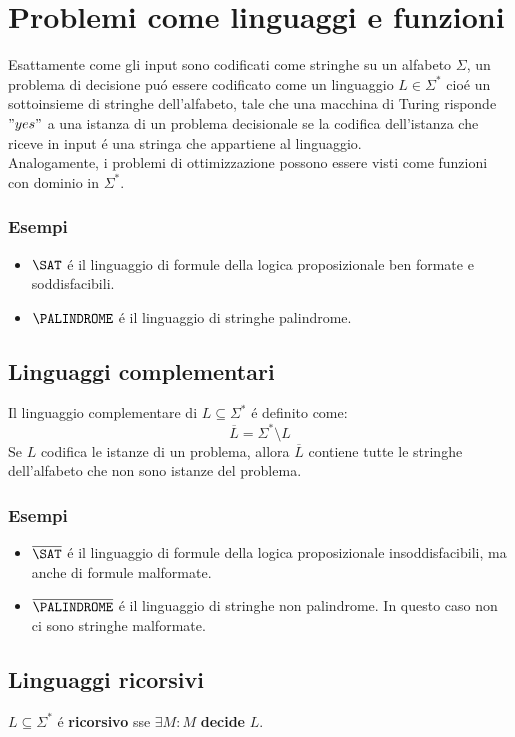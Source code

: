 
\section{Problemi come linguaggi e funzioni}

Esattamente come gli input sono codificati come stringhe su un alfabeto $\Sigma$, 
un problema di decisione puó essere codificato come un linguaggio $L \in \Sigma^*$ 
cioé un sottoinsieme di stringhe dell'alfabeto, tale che una macchina di Turing 
risponde $"yes"$ a una istanza di un problema decisionale se la codifica dell'istanza 
che riceve in input é una stringa che appartiene al linguaggio. \\

Analogamente, i problemi di ottimizzazione possono essere visti come funzioni con dominio in $\Sigma^*$.
\subsubsection*{Esempi}
\begin{itemize}
	\item ${\SAT}$ é il linguaggio di formule della logica proposizionale ben formate e soddisfacibili.
	\item ${\PALINDROME}$ é il linguaggio di stringhe palindrome.
\end{itemize}


\subsection{Linguaggi complementari}
Il linguaggio complementare di $L \subseteq \Sigma^*$ é definito come:
\[\overline{L} = \Sigma^* \setminus L\]
Se $L$ codifica le istanze di un problema, allora $\overline{L}$ contiene tutte le stringhe dell'alfabeto che non sono istanze del problema.
\subsubsection*{Esempi}
\begin{itemize}
	\item $\overline{\SAT}$ é il linguaggio di formule della logica proposizionale insoddisfacibili, ma anche di formule malformate.
	\item $\overline{\PALINDROME}$ é il linguaggio di stringhe non palindrome. In questo caso non ci sono stringhe malformate.
\end{itemize}


\subsection{Linguaggi ricorsivi}
$L \subseteq \Sigma^*$ é \textbf{ricorsivo} sse $\exists M : M$ \textbf{decide} $L$.

